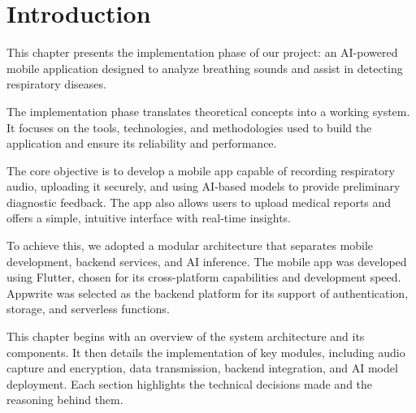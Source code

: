 
\section*{Introduction}

This chapter presents the implementation phase of our project: an AI-powered mobile application designed to analyze breathing sounds and assist in detecting respiratory diseases.

The implementation phase translates theoretical concepts into a working system. It focuses on the tools, technologies, and methodologies used to build the application and ensure its reliability and performance.

The core objective is to develop a mobile app capable of recording respiratory audio, uploading it securely, and using AI-based models to provide preliminary diagnostic feedback. The app also allows users to upload medical reports and offers a simple, intuitive interface with real-time insights.

To achieve this, we adopted a modular architecture that separates mobile development, backend services, and AI inference. The mobile app was developed using Flutter, chosen for its cross-platform capabilities and development speed. Appwrite was selected as the backend platform for its support of authentication, storage, and serverless functions.

This chapter begins with an overview of the system architecture and its components. It then details the implementation of key modules, including audio capture and encryption, data transmission, backend integration, and AI model deployment. Each section highlights the technical decisions made and the reasoning behind them.
